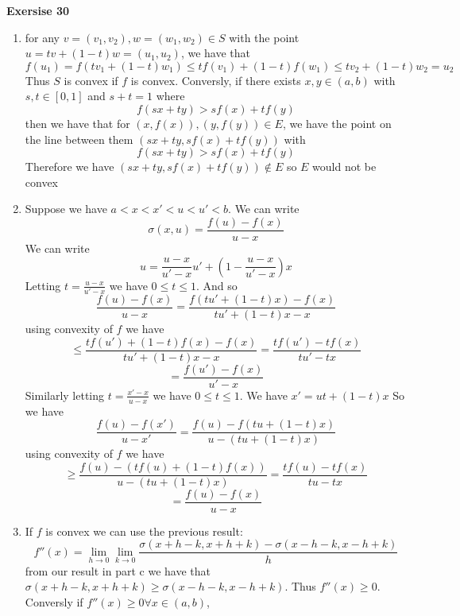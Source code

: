 \documentclass[12pt]{article}
\newenvironment{ques}[1]{\textbf{Exersise #1}\vspace{1 mm}\\ }{\bigskip}
\theoremstyle{definition}
\renewcommand{\l}{\left }
\renewcommand{\r}{\right }
\begin{document}
\begin{ques}{30}
\begin{enumerate}
\item
	for any $v = (v_1,v_2), w = (w_1,w_2) \in S$ with the point $u = tv + (1-t)w =
	(u_1, u_2)$, we have that
	$$f(u_1) = f\l(tv_1 + (1-t)w_1\r)  \leq tf(v_1) + (1 - t)f(w_1) \leq tv_2 +
	(1-t)w_2 = u_2$$
	Thus $S$ is convex if $f$ is convex. Conversly, if there exists $x,y \in (a,b)$
	with $s,t\in [0,1]$ and $s+t = 1$ where
	$$f(sx + ty) > sf(x) + tf(y)$$
	then we have that for $(x,f(x)), (y,f(y)) \in E$, we have the point on the
	line between them $(sx + ty, sf(x) + tf(y))$ with 
	$$f(sx + ty) > sf(x) + tf(y)$$
	Therefore we have $(sx + ty, sf(x) + tf(y)) \notin E$ so $E$ would not be
	convex

\addtocounter{enumi}{1}
\item
	Suppose we have $a< x< x' < u < u' <b$. We can write
	$$\sigma(x,u) = \frac{f(u) - f(x)}{u - x}$$
	We can write
	$$u = \frac{u - x}{u' - x}u' + \l(1 - \frac{u - x}{u' - x}\r)x$$
	Letting $t = \frac{u - x}{u' - x}$ we have $0 \leq t \leq 1$. And so
	$$\frac{f(u) - f(x)}{u - x} = \frac{f(tu' + (1-t)x) - f(x)}{tu' + (1-t)x - x}$$
	using convexity of $f$ we have
	$$\leq \frac{tf(u') + (1-t)f(x) - f(x)}{tu' + (1-t)x - x} = \frac{tf(u')
	-tf(x)}{tu' -tx}$$
	$$= \frac{f(u') - f(x)}{u'-x}$$
	Similarly letting $t = \frac{x' - x}{u-x}$ we have $0 \leq t \leq 1$. We
	have $x' = ut + (1-t)x$ So we have
	$$\frac{f(u) - f(x')}{u - x'} = \frac{f(u) - f(tu + (1-t)x)}{u - (tu + (1-t)x)}$$
	using convexity of $f$ we have
	$$\geq \frac{f(u) - (tf(u) + (1-t)f(x))}{u - (tu + (1-t)x)} = \frac{tf(u)
	-tf(x)}{tu -tx}$$
	$$= \frac{f(u) - f(x)}{u-x}$$
\item
	If $f$ is convex we can use the previous result:\\
	$$f''(x) = \lim_{h \to 0} \lim_{k \to 0} \frac{\sigma(x + h -k, x + h + k) -
	\sigma(x - h -k, x - h + k)}{h}$$
	from our result in part c we have that $\sigma(x + h -k, x + h + k) \geq
	\sigma(x - h -k, x - h + k)$. Thus $f''(x) \geq 0$.\\
	Conversly if $f''(x) \geq 0 \forall x \in (a,b)$,
	
\end{enumerate}
\end{ques}
\end{document}
